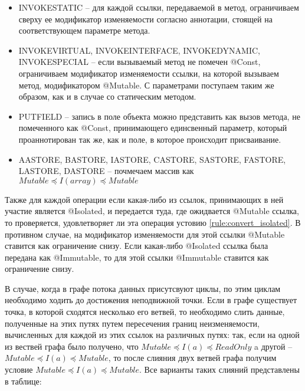 \begin{itemize}
	\item {\small INVOKESTATIC} -- для каждой ссылки, передаваемой в метод, ограничиваем сверху ее модификатор изменяемости согласно аннотации, стоящей на соответствующем параметре метода.  
	\item {\small INVOKEVIRTUAL, INVOKEINTERFACE, INVOKEDYNAMIC, INVOKESPECIAL} -- если вызываемый метод не помечен @Const, ограничиваем модификатор изменяемости ссылки, на которой вызываем метод, модификатором @Mutable. С параметрами поступаем таким же образом, как и в случае со статическим методом. 
	\item {\small PUTFIELD} -- запись в поле объекта можно представить как вызов метода, не помеченного как @Const, принимающего единсвенный параметр, который проаннотирован так же, как и поле, в которое происходит присваивание.
	\item {\small AASTORE, BASTORE, IASTORE, CASTORE, SASTORE, FASTORE, LASTORE, DASTORE} -- почмечаем массив как $Mutable \preceq I(array) \preceq Mutable$
\end{itemize}

Также для каждой операции если какая-либо из ссылок, принимающих в ней участие является @Isolated, и передается туда, где ожидвается @Mutable ссылка, то проверяется, удовлетворяет ли эта операция устовию \ref{rule:convert_isolated}. В противном случае, на модификатор изменяемости для этой ссылки @Mutable ставится как ограничение снизу. Если какая-либо @Isolated ссылка была передана как @Immutable, то для этой ссылки @Immutable ставится как ограничение снизу.   

В случае, когда в графе потока данных присутсвуют циклы, по этим циклам необходимо ходить до достижения неподвижной точки. Если в графе существует точка, в которой сходятся несколько его ветвей, то необходимо слить данные, полученные на этих путях путем пересечения границ неизменяемости, вычисленных для каждой из этих ссылок на различных путях: так, если на одной из вествей графа было получено, что $Mutable \preceq I(a) \preceq  ReadOnly$ a другой -- $Mutable \preceq I(a) \preceq  Mutable$, то после слияния двух ветвей графа получим условие $Mutable \preceq I(a) \preceq  Mutable$. Все варианты таких слияний представлены в таблице:



